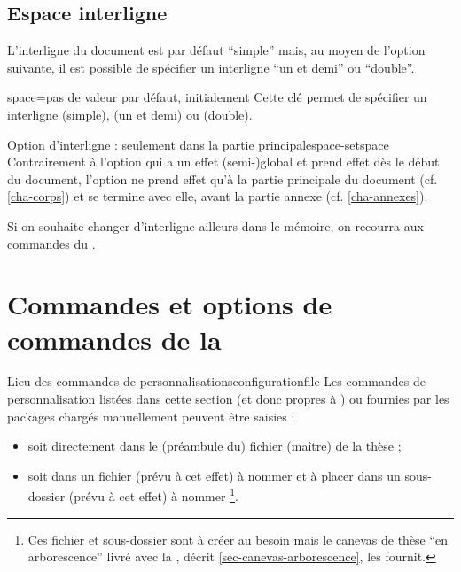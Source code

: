 \subsection{Espace interligne}\label{sec-interligne}

L'interligne du document est par défaut \enquote{simple} mais, au moyen de
l'option  suivante, il est possible de spécifier un interligne
\enquote{un et demi} ou \enquote{double}.

\begin{docKey}{space}{=\textbar{}\textbar{}}{pas de valeur par défaut,
    initialement }
  Cette clé permet de spécifier un interligne  (simple),
   (un et demi) ou  (double).
\end{docKey}

\begin{dbwarning}{Option d'interligne : seulement dans la partie
    principale}{space-setspace}
  Contrairement à l'option  qui a un effet (semi-)global et
  prend effet dès le début du document, l'option  ne prend effet
  qu'à la partie principale du document (cf. \vref{cha-corps}) et se termine
  avec elle, avant la partie annexe (cf. \vref{cha-annexes}).
\end{dbwarning}

Si on souhaite changer d'interligne ailleurs dans le mémoire, on recourra aux
commandes du  .

\section{Commandes et options de commandes de la \yatCl}

\begin{dbremark}{Lieu des commandes de personnalisations}{configurationfile}
  Les commandes de personnalisation listées dans cette section (et donc propres
  à \yatCl{}) ou fournies par les packages chargés manuellement peuvent être
  saisies :
  \begin{itemize}
  \item soit directement dans le (préambule du) fichier (maître) de la thèse ;
  \item soit dans un fichier (prévu à cet effet) à nommer
    \file{\configurationfile} et à placer dans un sous-dossier (prévu à cet
    effet) à nommer \folder{\configurationdirectory}\footnote{Ces fichier et
      sous-dossier sont à créer au besoin mais le canevas de thèse \enquote{en
        arborescence} livré avec la \yatCl, décrit \vref{sec-canevas-arborescence}, les
      fournit.}.
  \end{itemize}
\end{dbremark}

